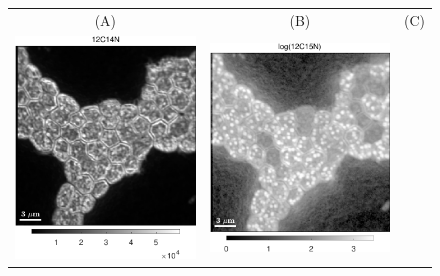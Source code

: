 \begin{figure}[!ht]
\centering
\begin{tabular}{ccc}
(A) & (B) & (C) \\
\includegraphics[scale=0.4, valign=t]{figs6/12C14N}
&
\includegraphics[scale=0.4, valign=t]{figs6/12C15N}

\end{tabular}
\end{figure}
